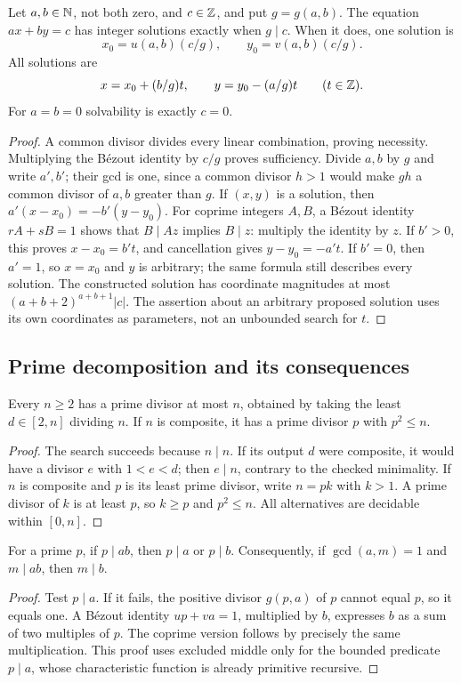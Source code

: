 \begin{theorem}\label{el:linear}
Let $a,b\in\mathbb N$, not both zero, and $c\in\mathbb Z$, and put $g=g(a,b)$.
The equation $ax+by=c$ has integer solutions exactly when $g\mid c$.
When it does, one solution is
\[
 x_0=u(a,b)(c/g),\qquad y_0=v(a,b)(c/g).
\]
All solutions are
\[
 x=x_0+(b/g)t,\qquad y=y_0-(a/g)t\qquad(t\in\mathbb Z).
\]
For $a=b=0$ solvability is exactly $c=0$.
\end{theorem}
\begin{proof}
A common divisor divides every linear combination, proving necessity.
Multiplying the B\'ezout identity by $c/g$ proves sufficiency.  Divide
$a,b$ by $g$ and write $a',b'$; their gcd is one, since a common divisor
$h>1$ would make $gh$ a common divisor of $a,b$ greater than $g$.
If $(x,y)$ is a solution, then
$a'(x-x_0)=-b'(y-y_0)$.  For coprime integers $A,B$, a B\'ezout
identity $rA+sB=1$ shows that $B\mid Az$ implies $B\mid z$:
multiply the identity by $z$.  If $b'>0$, this proves
$x-x_0=b't$, and cancellation gives $y-y_0=-a't$.
If $b'=0$, then $a'=1$, so $x=x_0$ and $y$ is arbitrary; the same
formula still describes every solution.  The constructed solution has
coordinate magnitudes at most
$(a+b+2)^{a+b+1}|c|$.  The assertion about an arbitrary proposed solution
uses its own coordinates as parameters, not an unbounded search for $t$.
\end{proof}

\subsection{Prime decomposition and its consequences}

\begin{lemma}\label{el:leastprime}
Every $n\ge2$ has a prime divisor at most $n$, obtained by taking the
least $d\in[2,n]$ dividing $n$.  If $n$ is composite, it has a prime
divisor $p$ with $p^2\le n$.
\end{lemma}
\begin{proof}
The search succeeds because $n\mid n$.  If its output $d$ were
composite, it would have a divisor $e$ with $1<e<d$; then $e\mid n$,
contrary to the checked minimality.  If $n$ is composite and $p$ is its
least prime divisor, write $n=pk$ with $k>1$.  A prime divisor of $k$
is at least $p$, so $k\ge p$ and $p^2\le n$.
All alternatives are decidable within $[0,n]$.
\end{proof}

\begin{theorem}\label{el:euclidlemma}
For a prime $p$, if $p\mid ab$, then $p\mid a$ or $p\mid b$.
Consequently, if $\gcd(a,m)=1$ and $m\mid ab$, then $m\mid b$.
\end{theorem}
\begin{proof}
Test $p\mid a$.  If it fails, the positive divisor $g(p,a)$ of $p$
cannot equal $p$, so it equals one.  A B\'ezout identity $up+va=1$,
multiplied by $b$, expresses $b$ as a sum of two multiples of $p$.
The coprime version follows by precisely the same multiplication.
This proof uses excluded middle only for the bounded predicate
$p\mid a$, whose characteristic function is already primitive recursive.
\end{proof}

